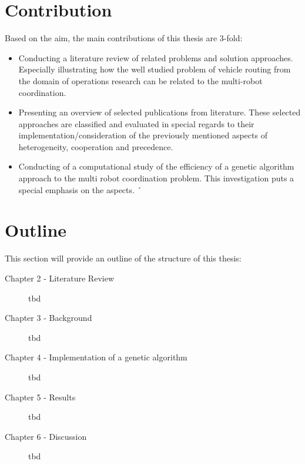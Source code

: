 \section{Contribution} \label{sec:contribution}

Based on the aim, the main contributions of this thesis are 3-fold:
\begin{itemize}
\item Conducting a literature review of related problems and solution approaches. Especially illustrating how the well studied problem of vehicle routing from the domain of operations research can be related to the multi-robot coordination.
\item Presenting an overview of selected publications from literature. These selected approaches are classified and evaluated in special regards to their implementation/consideration of the previously mentioned aspects of heterogeneity, cooperation and precedence.
\item Conducting of a computational study of the efficiency of a genetic algorithm approach to the multi robot coordination problem. This investigation puts a special emphasis on the aspects. ´
\end{itemize}


\section{Outline} \label{sec:outline}

This section will provide an outline of the structure of this thesis:
\begin{description}
\item[Chapter 2 - Literature Review] tbd
\item[Chapter 3 - Background] tbd
\item[Chapter 4 - Implementation of a genetic algorithm] tbd
\item[Chapter 5 - Results] tbd
\item[Chapter 6 - Discussion] tbd
\end{description}

\newpage

